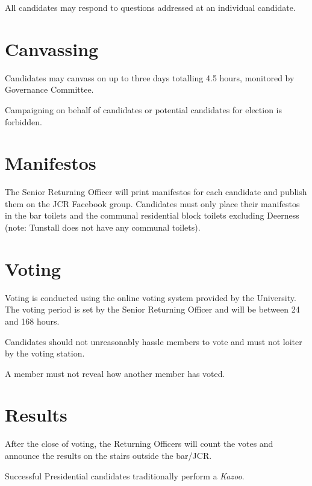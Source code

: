 \documentclass[12pt]{article}
\begin{document}
    All candidates may respond to questions addressed at an individual candidate.

    \section{Canvassing}
    Candidates may canvass on up to three days totalling 4.5 hours, monitored by Governance Committee.

    Campaigning on behalf of candidates or potential candidates for election is forbidden.

    \section{Manifestos}
    The Senior Returning Officer will print manifestos for each candidate and publish them on the JCR Facebook group. Candidates must only place their manifestos in the bar toilets and the communal residential block toilets excluding Deerness (note: Tunstall does not have any communal toilets).

    \section{Voting}
    Voting is conducted using the online voting system provided by the University.
    The voting period is set by the Senior Returning Officer and will be between 24 and 168 hours.

    Candidates should not unreasonably hassle members to vote and must not loiter by the voting station.

    A member must not reveal how another member has voted.

    \section{Results}
    After the close of voting, the Returning Officers will count the votes and announce the results on the stairs outside the bar/JCR.

    Successful Presidential candidates traditionally perform a \emph{Kazoo}.
\end{document}
